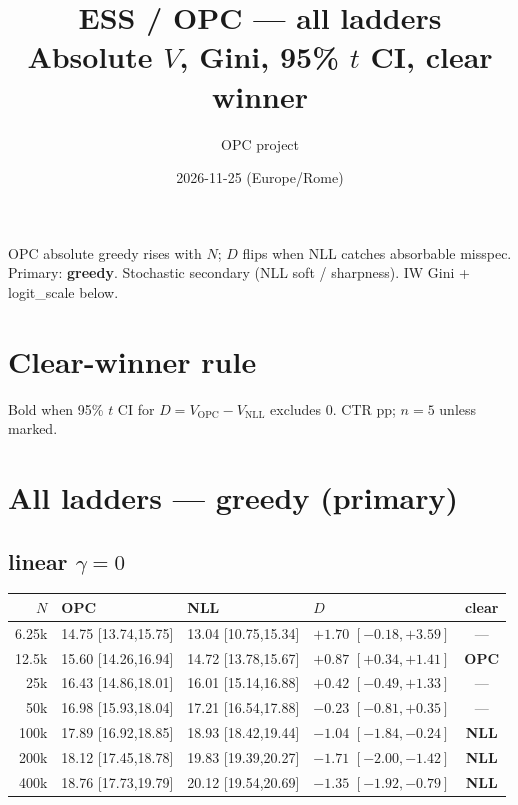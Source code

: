 \documentclass[10pt]{article}
\title{\textbf{ESS / OPC --- all ladders}\\[0.15em]
\large Absolute \(V\), Gini, 95\% \(t\) CI, clear winner}
\author{OPC project}
\date{2026-11-25 (Europe/Rome)}
\begin{document}
\maketitle

OPC absolute greedy rises with \(N\); \(D\) flips when NLL catches absorbable misspec.
Primary: \textbf{greedy}. Stochastic secondary (NLL soft / sharpness). IW Gini + logit\_scale below.

\section*{Clear-winner rule}
Bold when 95\% $t$ CI for $D=V_{\mathrm{OPC}}-V_{\mathrm{NLL}}$ excludes 0. CTR pp; $n{=}5$ unless marked.

\section*{All ladders --- greedy (primary)}

\subsection*{linear $\gamma{=}0$}
{\scriptsize
\begin{tabular}{@{}r lll c@{}}
\toprule
$N$ & OPC & NLL & $D$ & clear \\
\midrule
6.25k & 14.75 [13.74,15.75] & 13.04 [10.75,15.34] & $+1.70$ $[-0.18,+3.59]$ & — \\
12.5k & 15.60 [14.26,16.94] & 14.72 [13.78,15.67] & $+0.87$ $[+0.34,+1.41]$ & \textbf{OPC} \\
25k & 16.43 [14.86,18.01] & 16.01 [15.14,16.88] & $+0.42$ $[-0.49,+1.33]$ & — \\
50k & 16.98 [15.93,18.04] & 17.21 [16.54,17.88] & $-0.23$ $[-0.81,+0.35]$ & — \\
100k & 17.89 [16.92,18.85] & 18.93 [18.42,19.44] & $-1.04$ $[-1.84,-0.24]$ & \textbf{NLL} \\
200k & 18.12 [17.45,18.78] & 19.83 [19.39,20.27] & $-1.71$ $[-2.00,-1.42]$ & \textbf{NLL} \\
400k & 18.76 [17.73,19.79] & 20.12 [19.54,20.69] & $-1.35$ $[-1.92,-0.79]$ & \textbf{NLL} \\
\bottomrule
\end{tabular}}
\end{document}
